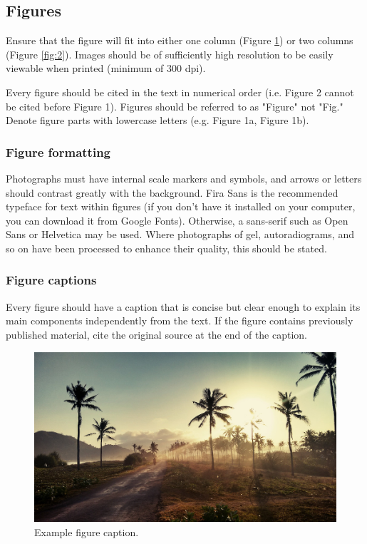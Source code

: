 \documentclass[twocolumn,twoside]{base/ajstd}
\begin{document}
\subsection{Figures}

Ensure that the figure will fit into either one column (Figure \ref{fig:1}) or two columns (Figure \ref{fig:2}). Images should be of sufficiently high resolution to be easily viewable when printed (minimum of 300 dpi).

Every figure should be cited in the text in numerical order (i.e. Figure 2 cannot be cited before Figure 1). Figures should be referred to as "Figure" not "Fig." Denote figure parts with lowercase letters (e.g. Figure 1a, Figure 1b).

\subsubsection{Figure formatting}

Photographs must have internal scale markers and symbols, and arrows or letters should contrast greatly with the background. Fira Sans is the recommended typeface for text within figures (if you don’t have it installed on your computer, you can download it from Google Fonts). Otherwise, a sans-serif such as Open Sans or Helvetica may be used. Where photographs of gel, autoradiograms, and so on have been processed to enhance their quality, this should be stated.

\subsubsection{Figure captions}

Every figure should have a caption that is concise but clear enough to explain its main components independently from the text. If the figure contains previously published material, cite the original source at the end of the caption.

\begin{figure}[!b]
	\centering
	\includegraphics[width=\linewidth]{figures/example-figure.jpg}
	\caption{Example figure caption.}
	\label{fig:1}
\end{figure}
\end{document}
